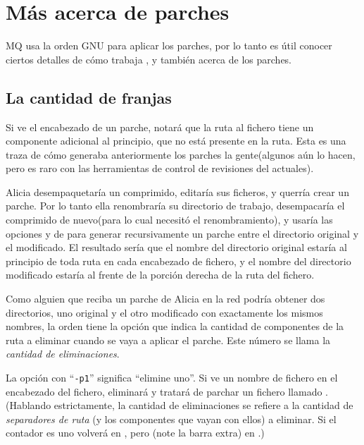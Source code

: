 \section{Más acerca de parches}
\label{sec:mq:adv-patch}

MQ usa la orden GNU  para aplicar los parches, por lo
tanto es útil conocer ciertos detalles de cómo trabaja
, y también acerca de los parches.

\subsection{La cantidad de franjas}

Si ve el encabezado de un parche, notará que la ruta al fichero tiene
un componente adicional al principio, que no está presente en la
ruta. Esta es una traza de cómo generaba anteriormente los parches la
gente(algunos aún lo hacen, pero es raro con las herramientas de
control de revisiones del actuales).

Alicia desempaquetaría un comprimido, editaría sus ficheros, y querría
crear un parche.  Por lo tanto ella renombraría su directorio de
trabajo, desempacaría el comprimido de nuevo(para lo cual necesitó el
renombramiento), y usaría las opciones  y
 de  para generar recursivamente un
parche entre el directorio original y el modificado.  El resultado
sería que el nombre del directorio original estaría al principio de
toda ruta en cada encabezado de fichero, y el nombre del directorio
modificado estaría al frente de la porción derecha de la ruta del
fichero.

Como alguien que reciba un parche de Alicia en la red podría obtener
dos directorios, uno original y el otro modificado con exactamente los
mismos nombres, la orden  tiene la opción
 que indica la cantidad de componentes de la ruta
a eliminar cuando se vaya a aplicar el parche.  Este número se
llama la \emph{cantidad de eliminaciones}.

La opción con ``\texttt{-p1}'' significa ``elimine uno''.  Si
 ve un nombre de fichero  en el
encabezado del fichero, eliminará  y tratará de parchar
un fichero llamado .  (Hablando estrictamente, la
cantidad de eliminaciones se refiere a la cantidad de \emph{separadores de
 ruta} (y los componentes que vayan con ellos) a eliminar.  Si el
contador es uno volverá  en , pero
 (note la barra extra) en .)

